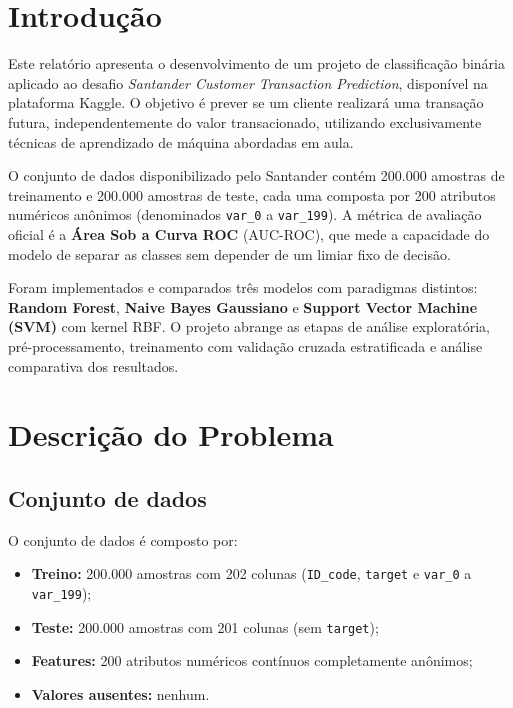 \documentclass[a4paper,12pt]{article}
\begin{document}
\newpage
\tableofcontents
\newpage

\section{Introdução}

Este relatório apresenta o desenvolvimento de um projeto de classificação binária aplicado ao desafio \textit{Santander Customer Transaction Prediction}, disponível na plataforma Kaggle. O objetivo é prever se um cliente realizará uma transação futura, independentemente do valor transacionado, utilizando exclusivamente técnicas de aprendizado de máquina abordadas em aula.

O conjunto de dados disponibilizado pelo Santander contém 200.000 amostras de treinamento e 200.000 amostras de teste, cada uma composta por 200 atributos numéricos anônimos (denominados \texttt{var\_0} a \texttt{var\_199}). A métrica de avaliação oficial é a \textbf{Área Sob a Curva ROC} (AUC-ROC), que mede a capacidade do modelo de separar as classes sem depender de um limiar fixo de decisão.

Foram implementados e comparados três modelos com paradigmas distintos: \textbf{Random Forest}, \textbf{Naive Bayes Gaussiano} e \textbf{Support Vector Machine (SVM)} com kernel RBF. O projeto abrange as etapas de análise exploratória, pré-processamento, treinamento com validação cruzada estratificada e análise comparativa dos resultados.

\newpage

\section{Descrição do Problema}

\subsection{Conjunto de dados}

O conjunto de dados é composto por:

\begin{itemize}
    \item \textbf{Treino:} 200.000 amostras com 202 colunas (\texttt{ID\_code}, \texttt{target} e \texttt{var\_0} a \texttt{var\_199});
    \item \textbf{Teste:} 200.000 amostras com 201 colunas (sem \texttt{target});
    \item \textbf{Features:} 200 atributos numéricos contínuos completamente anônimos;
    \item \textbf{Valores ausentes:} nenhum.
\end{itemize}
\end{document}
